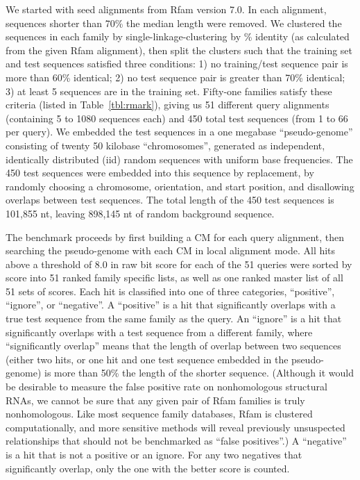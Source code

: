 \documentclass[11pt]{article}
\newif\ifdraft
\begin{document}
We started with seed alignments from Rfam version 7.0. In each
alignment, sequences shorter than 70\% the median length were removed.
We clustered the sequences in each family by single-linkage-clustering
by \% identity (as calculated from the given Rfam alignment), then
split the clusters such that the training set and test sequences
satisfied three conditions: 1) no training/test sequence pair is more
than 60\% identical; 2) no test sequence pair is greater than 70\%
identical; 3) at least 5 sequences are in the training set.  Fifty-one
families satisfy these criteria (listed in Table~\ref{tbl:rmark}),
giving us 51 different query alignments (containing 5 to 1080
sequences each) and 450 total test sequences (from 1 to 66 per query).
We embedded the test sequences in a one megabase ``pseudo-genome''
consisting of twenty 50 kilobase ``chromosomes'', generated as
independent, identically distributed (iid) random sequences with
uniform base frequencies.  The 450 test sequences were embedded into
this sequence by replacement, by randomly choosing a chromosome,
orientation, and start position, and disallowing overlaps between test
sequences. The total length of the 450 test sequences is 101,855 nt,
leaving 898,145 nt of random background sequence.

\ifdraft

\fi

The benchmark proceeds by first building a CM for each query
alignment, then searching the pseudo-genome with each CM in local
alignment mode. All hits above a threshold of 8.0 in raw bit score for
each of the 51 queries were sorted by score into 51 ranked family
specific lists, as well as one ranked master list of all 51 sets of
scores.  Each hit is classified into one of three categories,
``positive'', ``ignore'', or ``negative''. A ``positive'' is a hit
that significantly overlaps with a true test sequence from the same
family as the query.  An ``ignore'' is a hit that significantly
overlaps with a test sequence from a different family, where
``significantly overlap'' means that the length of overlap between two
sequences (either two hits, or one hit and one test sequence embedded
in the pseudo-genome) is more than 50\% the length of the shorter
sequence.  (Although it would be desirable to measure the false
positive rate on nonhomologous structural RNAs, we cannot be sure that
any given pair of Rfam families is truly nonhomologous. Like most
sequence family databases, Rfam is clustered computationally, and more
sensitive methods will reveal previously unsuspected relationships
that should not be benchmarked as ``false positives''.)  A
``negative'' is a hit that is not a positive or an ignore. For any two
negatives that significantly overlap, only the one with the better
score is counted.
\end{document}
